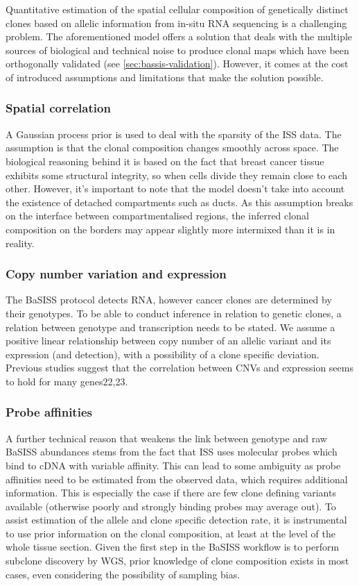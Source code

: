 Quantitative estimation of the spatial cellular composition of genetically distinct clones based on allelic information from in-situ RNA sequencing is a challenging problem. The aforementioned model offers a solution that deals with the multiple sources of biological and technical noise to produce clonal maps which have been orthogonally validated (see \cref{sec:bassis-validation}). However, it comes at the cost of introduced assumptions and limitations that make the solution possible.

\subsubsection*{Spatial correlation}
A Gaussian process prior is used to deal with the sparsity of the ISS data. The assumption is that the clonal composition changes smoothly across space. The biological reasoning behind it is based on the fact that breast cancer tissue exhibits some structural integrity, so when cells divide they remain close to each other. However, it’s important to note that the model doesn’t take into account the existence of detached compartments such as ducts. As this assumption breaks on the interface between compartmentalised regions, the inferred clonal composition on the borders may appear slightly more intermixed than it is in reality. 

\subsubsection*{Copy number variation and expression}
The BaSISS protocol detects RNA, however cancer clones are determined by their genotypes. To be able to conduct inference in relation to genetic clones, a relation between genotype and transcription needs to be stated. We assume a positive linear relationship between copy number of an allelic variant and its expression (and detection), with a possibility of a clone specific deviation. Previous studies suggest that the correlation between CNVs and expression seems to hold for many genes22,23.

\subsubsection*{Probe affinities}
A further technical reason that weakens the link between genotype and raw BaSISS abundances stems from the fact that ISS uses molecular probes which bind to cDNA with variable affinity. This can lead to some ambiguity as probe affinities need to be estimated from the observed data, which requires additional information. This is especially the case if there are few clone defining variants available (otherwise poorly and strongly binding probes may average out). To assist estimation of the allele and clone specific detection rate, it is instrumental to use prior information on the clonal composition, at least at the level of the whole tissue section. Given the first step in the BaSISS workflow is to perform subclone discovery by WGS, prior knowledge of clone composition exists in most cases, even considering the possibility of sampling bias.

